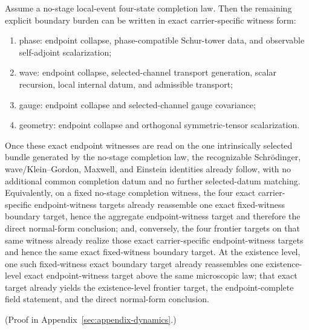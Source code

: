 \begin{theorem}
Assume a no-stage local-event four-state completion law.
Then the remaining explicit boundary burden can be written in exact
carrier-specific witness form:
\begin{enumerate}
\item phase: endpoint collapse, phase-compatible Schur-tower data, and
      observable self-adjoint scalarization;
\item wave: endpoint collapse, selected-channel transport generation,
      scalar recursion, local internal datum, and admissible transport;
\item gauge: endpoint collapse and selected-channel gauge covariance;
\item geometry: endpoint collapse and orthogonal symmetric-tensor
      scalarization.
\end{enumerate}
Once these exact endpoint witnesses are read on the one intrinsically selected
bundle generated by the no-stage completion law, the recognizable
Schr\"odinger, wave/Klein--Gordon, Maxwell, and Einstein identities already
follow, with no additional common completion datum and no further
selected-datum matching. Equivalently, on a fixed no-stage completion witness,
the four exact carrier-specific endpoint-witness targets already reassemble
one exact fixed-witness boundary target, hence the aggregate endpoint-witness
target and therefore the direct normal-form conclusion; and, conversely, the
four frontier targets on that same witness already realize those exact
carrier-specific endpoint-witness targets and hence the same exact
fixed-witness boundary target. At the existence level,
one such fixed-witness exact boundary target already reassembles one
existence-level exact endpoint-witness target above the same microscopic law;
that exact target already yields the existence-level frontier target, the
endpoint-complete field statement, and the direct normal-form conclusion.
\end{theorem}

(Proof in Appendix~\ref{sec:appendix-dynamics}.)

